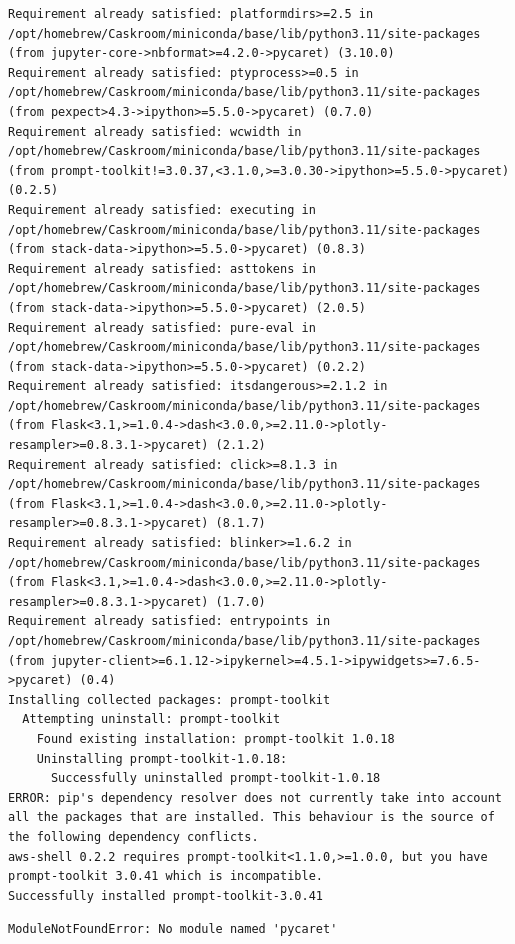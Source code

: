 \documentclass[
  letterpaper,
  DIV=11,
  numbers=noendperiod]{scrartcl}
\begin{document}
\begin{verbatim}
Requirement already satisfied: platformdirs>=2.5 in /opt/homebrew/Caskroom/miniconda/base/lib/python3.11/site-packages (from jupyter-core->nbformat>=4.2.0->pycaret) (3.10.0)
Requirement already satisfied: ptyprocess>=0.5 in /opt/homebrew/Caskroom/miniconda/base/lib/python3.11/site-packages (from pexpect>4.3->ipython>=5.5.0->pycaret) (0.7.0)
Requirement already satisfied: wcwidth in /opt/homebrew/Caskroom/miniconda/base/lib/python3.11/site-packages (from prompt-toolkit!=3.0.37,<3.1.0,>=3.0.30->ipython>=5.5.0->pycaret) (0.2.5)
Requirement already satisfied: executing in /opt/homebrew/Caskroom/miniconda/base/lib/python3.11/site-packages (from stack-data->ipython>=5.5.0->pycaret) (0.8.3)
Requirement already satisfied: asttokens in /opt/homebrew/Caskroom/miniconda/base/lib/python3.11/site-packages (from stack-data->ipython>=5.5.0->pycaret) (2.0.5)
Requirement already satisfied: pure-eval in /opt/homebrew/Caskroom/miniconda/base/lib/python3.11/site-packages (from stack-data->ipython>=5.5.0->pycaret) (0.2.2)
Requirement already satisfied: itsdangerous>=2.1.2 in /opt/homebrew/Caskroom/miniconda/base/lib/python3.11/site-packages (from Flask<3.1,>=1.0.4->dash<3.0.0,>=2.11.0->plotly-resampler>=0.8.3.1->pycaret) (2.1.2)
Requirement already satisfied: click>=8.1.3 in /opt/homebrew/Caskroom/miniconda/base/lib/python3.11/site-packages (from Flask<3.1,>=1.0.4->dash<3.0.0,>=2.11.0->plotly-resampler>=0.8.3.1->pycaret) (8.1.7)
Requirement already satisfied: blinker>=1.6.2 in /opt/homebrew/Caskroom/miniconda/base/lib/python3.11/site-packages (from Flask<3.1,>=1.0.4->dash<3.0.0,>=2.11.0->plotly-resampler>=0.8.3.1->pycaret) (1.7.0)
Requirement already satisfied: entrypoints in /opt/homebrew/Caskroom/miniconda/base/lib/python3.11/site-packages (from jupyter-client>=6.1.12->ipykernel>=4.5.1->ipywidgets>=7.6.5->pycaret) (0.4)
Installing collected packages: prompt-toolkit
  Attempting uninstall: prompt-toolkit
    Found existing installation: prompt-toolkit 1.0.18
    Uninstalling prompt-toolkit-1.0.18:
      Successfully uninstalled prompt-toolkit-1.0.18
ERROR: pip's dependency resolver does not currently take into account all the packages that are installed. This behaviour is the source of the following dependency conflicts.
aws-shell 0.2.2 requires prompt-toolkit<1.1.0,>=1.0.0, but you have prompt-toolkit 3.0.41 which is incompatible.
Successfully installed prompt-toolkit-3.0.41
\end{verbatim}

\begin{verbatim}
ModuleNotFoundError: No module named 'pycaret'
\end{verbatim}
\end{document}
